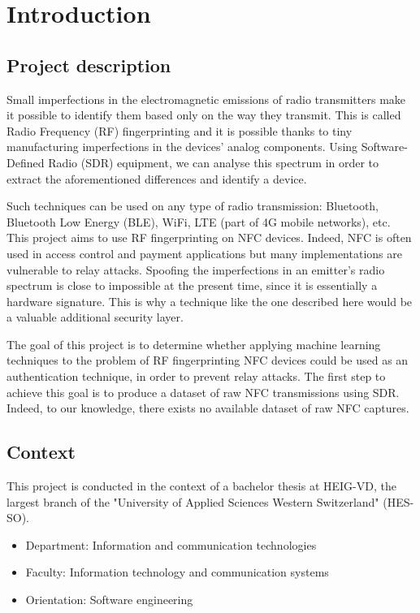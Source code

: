 \section{Introduction}

\subsection{Project description}
Small imperfections in the electromagnetic emissions of radio transmitters make it possible to identify them based only on the way they transmit. This is called Radio Frequency (RF) fingerprinting and it is possible thanks to tiny manufacturing imperfections in the devices' analog components. Using Software-Defined Radio (SDR) equipment, we can analyse this spectrum in order to extract the aforementioned differences and identify a device.

Such techniques can be used on any type of radio transmission: Bluetooth, Bluetooth Low Energy (BLE), WiFi, LTE (part of 4G mobile networks), etc. This project aims to use RF fingerprinting on NFC devices. Indeed, NFC is often used in access control and payment applications but many implementations are vulnerable to relay attacks. Spoofing the imperfections in an emitter's radio spectrum is close to impossible at the present time, since it is essentially a hardware signature. This is why a technique like the one described here would be a valuable additional security layer.

The goal of this project is to determine whether applying machine learning techniques to the problem of RF fingerprinting NFC devices could be used as an authentication technique, in order to prevent relay attacks. The first step to achieve this goal is to produce a dataset of raw NFC transmissions using SDR. Indeed, to our knowledge, there exists no available dataset of raw NFC captures.

\subsection{Context}
This project is conducted in the context of a bachelor thesis at HEIG-VD, the largest branch of the "University of Applied Sciences Western Switzerland" (HES-SO).

\begin{itemize}
  \item Department: Information and communication technologies
  \item Faculty: Information technology and communication systems
  \item Orientation: Software engineering
\end{itemize}

